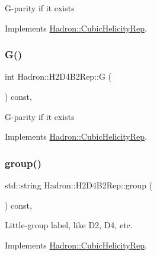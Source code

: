 G-\/parity if it exists 

Implements \mbox{\hyperlink{structHadron_1_1CubicHelicityRep_a50689f42be1e6170aa8cf6ad0597018b}{Hadron\+::\+Cubic\+Helicity\+Rep}}.

\mbox{\label{structHadron_1_1H2D4B2Rep_a836bcf373e02587cc325b7b43dfd871f}} 
\subsubsection{\texorpdfstring{G()}{G()}\hspace{0.1cm}{\footnotesize\ttfamily [2/2]}}
{\footnotesize\ttfamily int Hadron\+::\+H2\+D4\+B2\+Rep\+::G (\begin{DoxyParamCaption}{ }\end{DoxyParamCaption}) const\hspace{0.3cm}{\ttfamily [inline]}, {\ttfamily [virtual]}}

G-\/parity if it exists 

Implements \mbox{\hyperlink{structHadron_1_1CubicHelicityRep_a50689f42be1e6170aa8cf6ad0597018b}{Hadron\+::\+Cubic\+Helicity\+Rep}}.

\mbox{\label{structHadron_1_1H2D4B2Rep_a48ee68e2c92450c822756a18a840be70}} 
\subsubsection{\texorpdfstring{group()}{group()}\hspace{0.1cm}{\footnotesize\ttfamily [1/3]}}
{\footnotesize\ttfamily std\+::string Hadron\+::\+H2\+D4\+B2\+Rep\+::group (\begin{DoxyParamCaption}{ }\end{DoxyParamCaption}) const\hspace{0.3cm}{\ttfamily [inline]}, {\ttfamily [virtual]}}

Little-\/group label, like D2, D4, etc. 

Implements \mbox{\hyperlink{structHadron_1_1CubicHelicityRep_a101a7d76cd8ccdad0f272db44b766113}{Hadron\+::\+Cubic\+Helicity\+Rep}}.

\mbox{\label{structHadron_1_1H2D4B2Rep_a48ee68e2c92450c822756a18a840be70}} 
